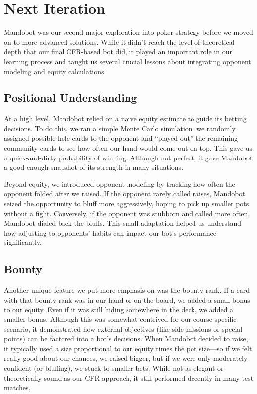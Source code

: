 \documentclass{article}
\begin{document}
    \section*{Next Iteration}

    Mandobot was our second major exploration into poker strategy before we moved on to more advanced solutions. While it didn’t reach the level of theoretical depth that our final CFR-based bot did, it played an important role in our learning process and taught us several crucial lessons about integrating opponent modeling and equity calculations.
    
    \subsection*{Positional Understanding}
    
    At a high level, Mandobot relied on a naive equity estimate to guide its betting decisions. To do this, we ran a simple Monte Carlo simulation: we randomly assigned possible hole cards to the opponent and “played out” the remaining community cards to see how often our hand would come out on top. This gave us a quick-and-dirty probability of winning. Although not perfect, it gave Mandobot a good-enough snapshot of its strength in many situations.

    Beyond equity, we introduced opponent modeling by tracking how often the opponent folded after we raised. If the opponent rarely called raises, Mandobot seized the opportunity to bluff more aggressively, hoping to pick up smaller pots without a fight. Conversely, if the opponent was stubborn and called more often, Mandobot dialed back the bluffs. This small adaptation helped us understand how adjusting to opponents’ habits can impact our bot’s performance significantly.

    \subsection*{Bounty}

    Another unique feature we put more emphasis on was the bounty rank. If a card with that bounty rank was in our hand or on the board, we added a small bonus to our equity. Even if it was still hiding somewhere in the deck, we added a smaller bonus. Although this was somewhat contrived for our course-specific scenario, it demonstrated how external objectives (like side missions or special points) can be factored into a bot’s decisions. When Mandobot decided to raise, it typically used a size proportional to our equity times the pot size—so if we felt really good about our chances, we raised bigger, but if we were only moderately confident (or bluffing), we stuck to smaller bets. While not as elegant or theoretically sound as our CFR approach, it still performed decently in many test matches.
\end{document}
